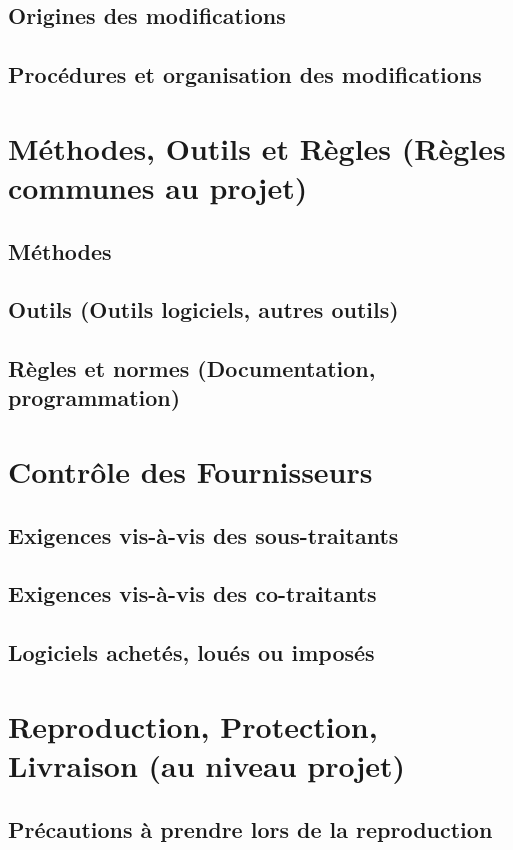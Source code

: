 \documentclass[a4paper]{article}
\begin{document}
\subsection{Origines des modifications}
\subsection{Procédures et organisation des modifications}

\section{Méthodes, Outils et Règles (Règles communes au projet)}
\subsection{Méthodes}
\subsection{Outils (Outils logiciels, autres outils)}
\subsection{Règles et normes   (Documentation, programmation)    }

\section{Contrôle des Fournisseurs}
\subsection{Exigences vis-à-vis des sous-traitants}
\subsection{Exigences vis-à-vis des co-traitants}
\subsection{Logiciels achetés, loués ou imposés}

\section{Reproduction, Protection, Livraison (au niveau projet)}
\subsection{Précautions à prendre lors de la reproduction}
\end{document}
